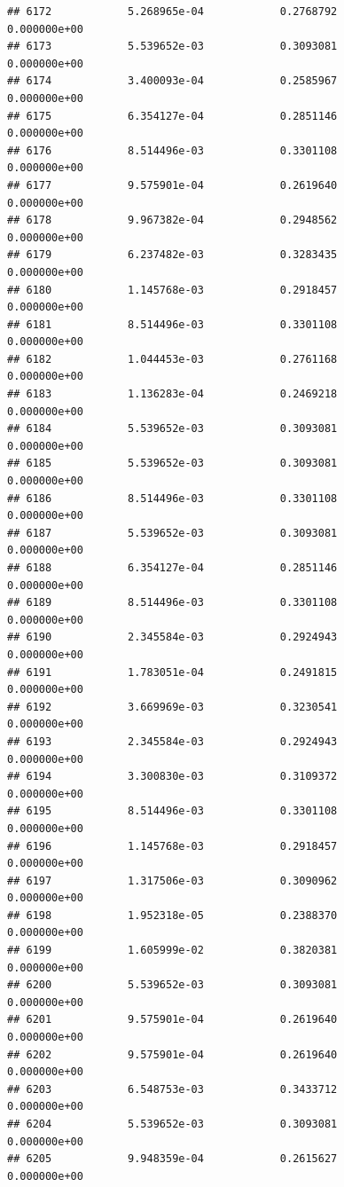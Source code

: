 \documentclass[
]{article}
\begin{document}
\begin{verbatim}
## 6172            5.268965e-04            0.2768792            0.000000e+00
## 6173            5.539652e-03            0.3093081            0.000000e+00
## 6174            3.400093e-04            0.2585967            0.000000e+00
## 6175            6.354127e-04            0.2851146            0.000000e+00
## 6176            8.514496e-03            0.3301108            0.000000e+00
## 6177            9.575901e-04            0.2619640            0.000000e+00
## 6178            9.967382e-04            0.2948562            0.000000e+00
## 6179            6.237482e-03            0.3283435            0.000000e+00
## 6180            1.145768e-03            0.2918457            0.000000e+00
## 6181            8.514496e-03            0.3301108            0.000000e+00
## 6182            1.044453e-03            0.2761168            0.000000e+00
## 6183            1.136283e-04            0.2469218            0.000000e+00
## 6184            5.539652e-03            0.3093081            0.000000e+00
## 6185            5.539652e-03            0.3093081            0.000000e+00
## 6186            8.514496e-03            0.3301108            0.000000e+00
## 6187            5.539652e-03            0.3093081            0.000000e+00
## 6188            6.354127e-04            0.2851146            0.000000e+00
## 6189            8.514496e-03            0.3301108            0.000000e+00
## 6190            2.345584e-03            0.2924943            0.000000e+00
## 6191            1.783051e-04            0.2491815            0.000000e+00
## 6192            3.669969e-03            0.3230541            0.000000e+00
## 6193            2.345584e-03            0.2924943            0.000000e+00
## 6194            3.300830e-03            0.3109372            0.000000e+00
## 6195            8.514496e-03            0.3301108            0.000000e+00
## 6196            1.145768e-03            0.2918457            0.000000e+00
## 6197            1.317506e-03            0.3090962            0.000000e+00
## 6198            1.952318e-05            0.2388370            0.000000e+00
## 6199            1.605999e-02            0.3820381            0.000000e+00
## 6200            5.539652e-03            0.3093081            0.000000e+00
## 6201            9.575901e-04            0.2619640            0.000000e+00
## 6202            9.575901e-04            0.2619640            0.000000e+00
## 6203            6.548753e-03            0.3433712            0.000000e+00
## 6204            5.539652e-03            0.3093081            0.000000e+00
## 6205            9.948359e-04            0.2615627            0.000000e+00

\end{verbatim}
\end{document}
